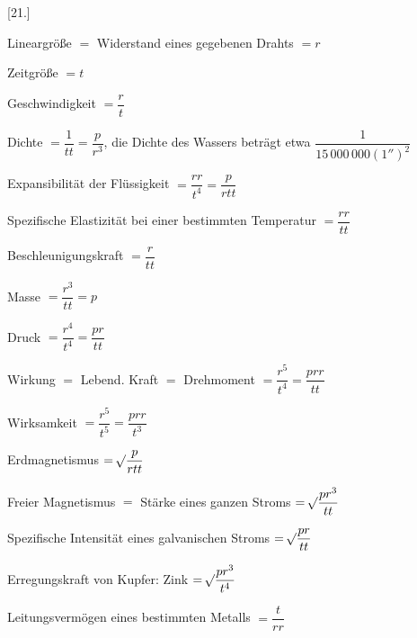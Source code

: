 \par{}
\begin{center}[21.]\end{center}
\noindent Lineargröße $=$ Widerstand eines gegebenen Drahts $=r$\par
\noindent Zeitgröße $=t$\par
\noindent Geschwindigkeit $=\dfrac rt$\par
\noindent Dichte $=\dfrac1{tt}=\dfrac p{r^3}$, die Dichte des Wassers beträgt etwa $\dfrac1{15\,000\,000(1'')^2}$\par
\noindent Expansibilität der Flüssigkeit $=\dfrac{rr}{t^4}=\dfrac p{rtt}$\par
\noindent Spezifische Elastizität bei einer bestimmten Temperatur $=\dfrac{rr}{tt}$\par
\noindent Beschleunigungskraft $=\dfrac r{tt}$\par
\noindent Masse $=\dfrac{r^3}{tt}=p$\par
\noindent Druck $=\dfrac{r^4}{t^4}=\dfrac{pr}{tt}$\par
\noindent Wirkung $=$ Lebend. Kraft $=$ Drehmoment $=\dfrac{r^5}{t^4}=\dfrac{prr}{tt}$\par
\noindent Wirksamkeit $=\dfrac{r^5}{t^5}=\dfrac{prr}{t^3}$\par
\noindent Erdmagnetismus $=\mathord{{}^{}\!\surd}\dfrac p{rtt}$\par
\noindent Freier Magnetismus $=$ Stärke eines ganzen Stroms $=\mathord{{}^{}\!\surd}\dfrac{pr^3}{tt}$\par
\noindent Spezifische Intensität eines galvanischen Stroms $=\mathord{{}^{}\!\surd}\dfrac{pr}{tt}$\par
\noindent Erregungskraft von Kupfer: Zink $=\mathord{{}^{}\!\surd}\dfrac{pr^3}{t^4}$\par
\noindent Leitungsvermögen eines bestimmten Metalls $=\dfrac t{rr}$\par

